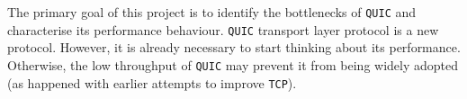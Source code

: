 \documentclass[12pt,a4paper,twoside,openright]{report}
\begin{document}
The primary goal of this project is to identify the bottlenecks of \texttt{QUIC} and characterise its performance behaviour.
\texttt{QUIC} transport layer protocol is a new protocol.
However, it is already necessary to start thinking about its performance.
Otherwise, the low throughput of \texttt{QUIC} may prevent it from being widely adopted (as happened with earlier attempts to improve \texttt{TCP}). 










 
 
 
\end{document}
